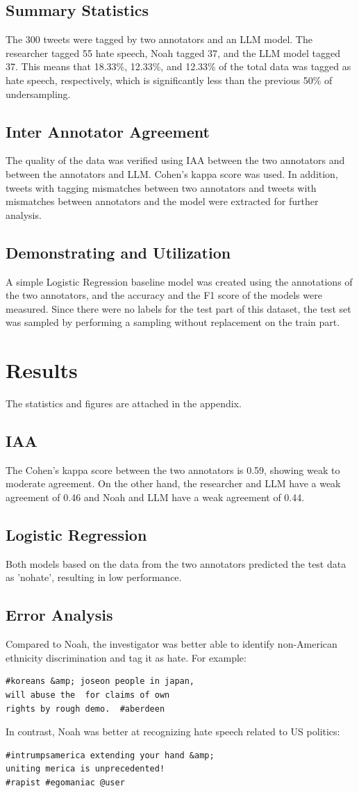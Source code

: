 \documentclass[11pt]{article}
\begin{document}
\subsection{Summary Statistics}
The 300 tweets were tagged by two annotators and an LLM model. The researcher tagged 55 hate speech, Noah tagged 37, and the LLM model tagged 37. This means that 18.33\%, 12.33\%, and 12.33\% of the total data was tagged as hate speech, respectively, which is significantly less than the previous 50\% of undersampling.

\subsection{Inter Annotator Agreement}
The quality of the data was verified using IAA between the two annotators and between the annotators and LLM. Cohen's kappa score was used. In addition, tweets with tagging mismatches between two annotators and tweets with mismatches between annotators and the model were extracted for further analysis.
\subsection{Demonstrating and Utilization}
A simple Logistic Regression baseline model was created using the annotations of the two annotators, and the accuracy and the F1 score of the models were measured. Since there were no labels for the test part of this dataset, the test set was sampled by performing a sampling without replacement on the train part.

\section{Results}
The statistics and figures are attached in the appendix.
\subsection{IAA}
The Cohen's kappa score between the two annotators is 0.59, showing weak to moderate agreement. On the other hand, the researcher and LLM have a weak agreement of 0.46 and Noah and LLM have a weak agreement of 0.44.
\subsection{Logistic Regression}
Both models based on the data from the two annotators predicted the test data as 'nohate', resulting in low performance.
\subsection{Error Analysis}
Compared to Noah, the investigator was better able to identify non-American ethnicity discrimination and tag it as hate. For example:
\begin{verbatim}
#koreans &amp; joseon people in japan,
will abuse the  for claims of own 
rights by rough demo.  #aberdeen
\end{verbatim}
In contrast, Noah was better at recognizing hate speech related to US politics:
\begin{verbatim}
#intrumpsamerica extending your hand &amp;
uniting merica is unprecedented!
#rapist #egomaniac @user
\end{verbatim}
\end{document}
